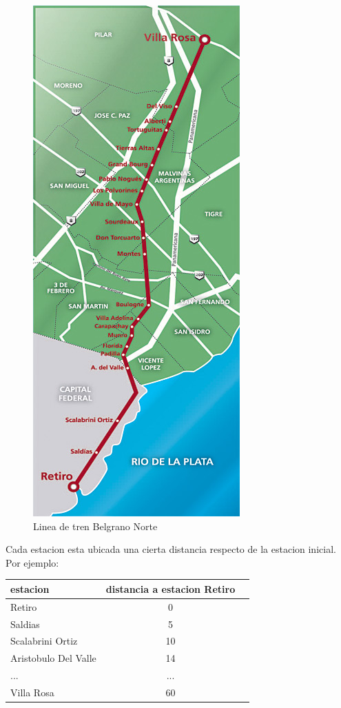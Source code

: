 \begin{figure}[htb]
	\begin{center}
		\includegraphics[scale=0.25]{imagenes/Belgrano-Norte.jpg}
	\end{center}
	\caption{Linea de tren Belgrano Norte}
\end{figure}

Cada estacion esta ubicada una cierta distancia respecto de la estacion inicial.
Por ejemplo:
\begin{center}
   \begin{tabular}{ | l | c | r | }
     \hline
     estacion & distancia a estacion Retiro \\ \hline
     Retiro  & 0 \\ \hline
     Saldias  & 5\\ \hline
     Scalabrini Ortiz & 10 \\ \hline
     Aristobulo Del Valle & 14 \\ \hline
     ... & ... \\ \hline
     Villa Rosa & 60 \\ 
     \hline
   \end{tabular}
\end{center}

